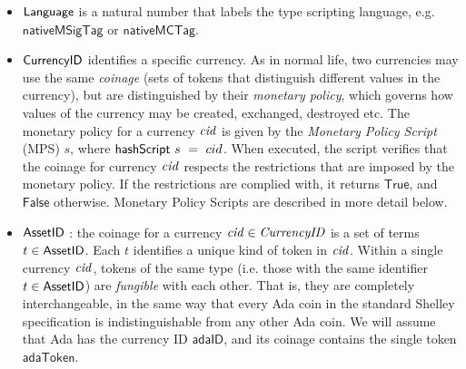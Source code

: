 \begin{itemize}

  \item $\mathsf{Language}$ is a natural number that labels the type scripting language, e.g.
    $\mathsf{nativeMSigTag}$ or $\mathsf{nativeMCTag}$. 

  \item $\mathsf{CurrencyID}$ identifies a specific currency.  As in normal life, two
    currencies may use the same \emph{coinage} (sets of tokens that distinguish different values in the currency),
    but are distinguished by their \emph{monetary policy}, which governs how values of the currency may be created,
    exchanged, destroyed etc.
    The monetary
    policy for a currency $\mathit{cid}$ is given by the \emph{Monetary Policy Script}
    (MPS) $s$, where $\mathsf{hashScript}~s~=~cid$. When executed, the script verifies that the coinage for currency $\mathit{cid}$
    respects the restrictions that are imposed by the
    monetary policy. If the restrictions are complied with, it returns
    $\mathsf{True}$, and
    $\mathsf{False}$ otherwise.  Monetary Policy Scripts are described in more detail below.



\item $\mathsf{AssetID}$ : the coinage for a currency $\mathit{cid} \in \mathit{CurrencyID}$ is a set of terms
  $t\in\mathsf{AssetID}$.  Each $t$ identifies a unique kind of token in $\mathit{cid}$. Within a single currency $\mathit{cid}$,
  tokens of the same type (i.e. those with the same identifier $t\in\mathsf{AssetID}$) are \emph{fungible}
  with each other. That is, they are completely interchangeable, in the same way that
  every Ada coin in the standard Shelley specification is indistinguishable from any other Ada coin.
  We will assume that Ada has the currency ID $\mathsf{adaID}$, and its coinage contains the single token $\mathsf{adaToken}$.


\end{itemize}
